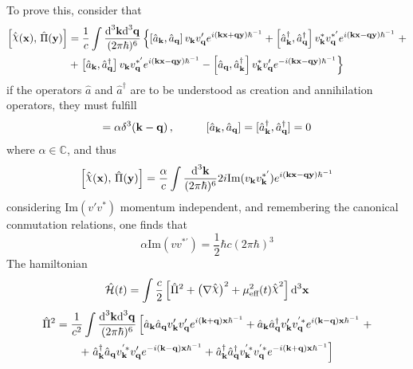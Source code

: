 \documentclass[pt=11, openany,twoside,a4paper]{scrbook}
\DeclareRobustCommand{\rchi}{{\mathpalette\irchi\relax}}
\newcommand{\irchi}[2]{\raisebox{\depth}{$#1\chi$}} %
\begin{document}
	To prove this, consider that
	\begin{multline}
		\left[\hat{\rchi}(\mathbf{x}),\,\hat{\Pi}(\mathbf{y})\right]=\frac{1}{c}\int\frac{\td^3\mathbf{k}\td^3\mathbf{q}}{(2\pi\hbar)^6}\left\{\left[\hat{a}_\mathbf{k},\hat{a}_\mathbf{q}\right]v_\mathbf{k}v'_\mathbf{q}e^{i\left(\mathbf{kx}+\mathbf{qy}\right)\hbar^{-1}}+\left[\hat{a}_\mathbf{k}^\dagger, \hat{a}_\mathbf{q}^\dagger\right]v_\mathbf{k}^*v_\mathbf{q}^{*'}e^{i(\mathbf{kx}-\mathbf{qy})\hbar^{-1}}\right.+\\
		+\left.\left[\hat{a}_\mathbf{k},\hat{a}_\mathbf{q}^\dagger\right] v_\mathbf{k}v^{*'}_\mathbf{q}e^{i(\mathbf{kx}-\mathbf{qy})\hbar^{-1}}-\left[\hat{a}_\mathbf{q},\hat{a}_\mathbf{k}^\dagger\right]v^*_\mathbf{k}v_\mathbf{q}'e^{-i(\mathbf{kx}-\mathbf{qy})\hbar^{-1}}\right\}
	\end{multline}
	if the operators $\hat{a}$ and $\hat{a}^\dagger$ are to be understood as creation and annihilation operators, they must fulfill
	\begin{equation}
		[\hat{a}_\mathbf{k},\hat{a}_\mathbf{q}^\dagger]=\alpha\delta^3(\mathbf{k}-\mathbf{q})\,,\hspace{1.0cm}[\hat{a}_\mathbf{k},\hat{a}_\mathbf{q}]=[\hat{a}_\mathbf{k}^\dagger,\hat{a}_\mathbf{q}^\dagger]=0
	\end{equation}
	where $\alpha\in\mathbb{C}$, and thus
	\begin{equation}
		\left[\hat{\rchi}(\mathbf{x}),\,\hat{\Pi}(\mathbf{y})\right]=\frac{\alpha}{c}\int\frac{\td^3\mathbf{k}}{(2\pi\hbar)^6}2i\text{Im}(v_\mathbf{k}v_\mathbf{k}^{*'})e^{i(\mathbf{kx}-\mathbf{qy})\hbar^{-1}}
	\end{equation}
	considering Im$(v'v^*)$ momentum independent, and remembering the canonical conmutation relations, one finds that
	\begin{equation}
		\alpha\text{Im}(vv^{*'})=\frac{1}{2}\hbar c(2\pi\hbar)^3
	\end{equation}
	The hamiltonian
	\begin{equation}
		\hat{\mathcal{H}}(t)=\int\frac{c}{2}\left[\hat{\Pi}^2+\left(\mathbf{\nabla}\hat{\rchi}\right)^2+\mu_{\text{eff}}^2(t)\hat{\rchi}^2\right]\td^3\mathbf{x}
	\end{equation}
	\begin{multline}
		\hat{\Pi}^2=\frac{1}{c^2}\int\frac{\text{d}^3\mathbf{k}\text{d}^3\mathbf{q}}{(2\pi\hbar)^6}\left[\hat{a}_\mathbf{k}\hat{a}_\mathbf{q}v'_\mathbf{k}v'_\mathbf{q}e^{i(\mathbf{k}+\mathbf{q})\mathbf{x}\hbar^{-1}}+\hat{a}_\mathbf{k}\hat{a}_\mathbf{q}^\dagger v'_\mathbf{k}v^{'*}_\mathbf{q}e^{i(\mathbf{k}-\mathbf{q})\mathbf{x}\hbar^{-1}}\right.+\\
		+\left.\hat{a}^\dagger_\mathbf{k}\hat{a}_\mathbf{q}v^{'*}_\mathbf{k}v'_\mathbf{q}e^{-i(\mathbf{k}-\mathbf{q})\mathbf{x}\hbar^{-1}}+\hat{a}_\mathbf{k}^\dagger\hat{a}_\mathbf{q}^\dagger v^{'*}_\mathbf{k}v^{'*}_\mathbf{q}e^{-i(\mathbf{k}+\mathbf{q})\mathbf{x}\hbar^{-1}}\right]
	\end{multline}
\end{document}
